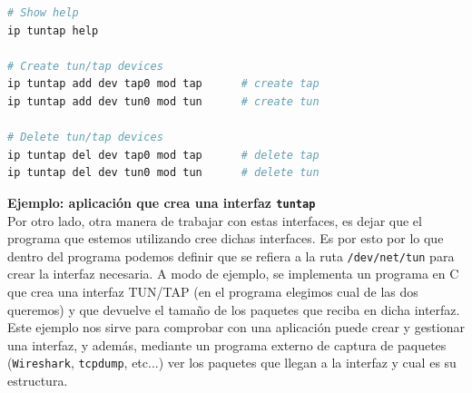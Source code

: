 \documentclass[12pt]{article}
\begin{document}
	\vspace{10px}

	\begin{lstlisting}[language=Bash, label=lst: ej2 tuntap ip, caption=Ejemplo de uso de \texttt{ip} para controlar interfaces TUN/TAP (\ref{bib: tunctl + ip})]
# Show help
ip tuntap help

# Create tun/tap devices
ip tuntap add dev tap0 mod tap		# create tap
ip tuntap add dev tun0 mod tun		# create tun

# Delete tun/tap devices
ip tuntap del dev tap0 mod tap		# delete tap
ip tuntap del dev tun0 mod tun		# delete tun
	\end{lstlisting}

	\pagebreak
	
	\noindent \textbf{\large Ejemplo: aplicación que crea una interfaz \texttt{tuntap}}\\

	\noindent Por otro lado, otra manera de trabajar con estas interfaces, es dejar que el programa que estemos utilizando cree dichas interfaces. Es por esto por lo que dentro del programa podemos definir que se refiera a la ruta \texttt{/dev/net/tun} para crear la interfaz necesaria. A modo de ejemplo, se implementa un programa en C que crea una interfaz TUN/TAP (en el programa elegimos cual de las dos queremos) y que devuelve el tamaño de los paquetes que reciba en dicha interfaz. Este ejemplo nos sirve para comprobar con una aplicación puede crear y gestionar una interfaz, y además, mediante un programa externo de captura de paquetes (\texttt{Wireshark}, \texttt{tcpdump}, etc...) ver los paquetes que llegan a la interfaz y cual es su estructura. \\
	
\end{document}
